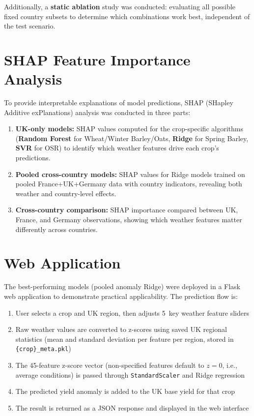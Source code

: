 \documentclass[12pt,a4paper]{report}
\begin{document}
Additionally, a \textbf{static ablation} study was conducted: evaluating all possible fixed country subsets to determine which combinations work best, independent of the test scenario.

\section{SHAP Feature Importance Analysis}
\label{sec:shap_methodology}

To provide interpretable explanations of model predictions, SHAP (SHapley Additive exPlanations) analysis was conducted in three parts:

\begin{enumerate}
    \item \textbf{UK-only models:} SHAP values computed for the crop-specific algorithms (\textbf{Random Forest} for Wheat/Winter Barley/Oats, \textbf{Ridge} for Spring Barley, \textbf{SVR} for OSR) to identify which weather features drive each crop's predictions.
    \item \textbf{Pooled cross-country models:} SHAP values for Ridge models trained on pooled France+UK+Germany data with country indicators, revealing both weather and country-level effects.
    \item \textbf{Cross-country comparison:} SHAP importance compared between UK, France, and Germany observations, showing which weather features matter differently across countries.
\end{enumerate}

\section{Web Application}
\label{sec:flask_app}

The best-performing models (pooled anomaly Ridge) were deployed in a Flask web application to demonstrate practical applicability. The prediction flow is:

\begin{enumerate}
    \item User selects a crop and UK region, then adjusts 5~key weather feature sliders
    \item Raw weather values are converted to z-scores using saved UK regional statistics (mean and standard deviation per feature per region, stored in \texttt{\{crop\}\_meta.pkl})
    \item The 45-feature z-score vector (non-specified features default to $z = 0$, i.e., average conditions) is passed through \texttt{StandardScaler} and Ridge regression
    \item The predicted yield anomaly is added to the UK base yield for that crop
    \item The result is returned as a JSON response and displayed in the web interface
\end{enumerate}
\end{document}
